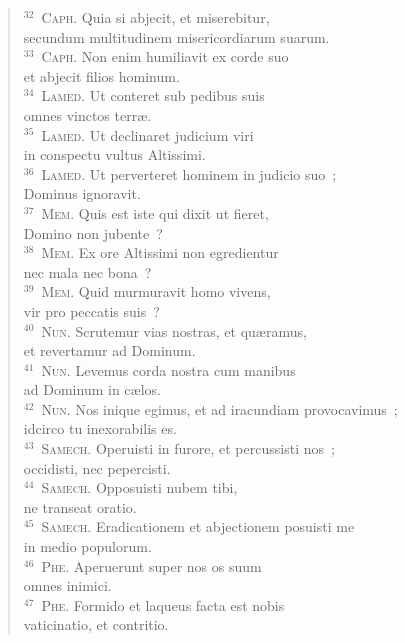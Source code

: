 \begin{flushleft}
\begin{verse}
${}^{32}$~\textsc{Caph.} Quia si abjecit, et miserebitur,\\ secundum multitudinem misericordiarum suarum.\\
${}^{33}$~\textsc{Caph.} Non enim humiliavit ex corde suo\\ et abjecit filios hominum.\\
${}^{34}$~\textsc{Lamed.} Ut conteret sub pedibus suis\\ omnes vinctos terr\ae .\\
${}^{35}$~\textsc{Lamed.} Ut declinaret judicium viri\\ in conspectu vultus Altissimi.\\
${}^{36}$~\textsc{Lamed.} Ut perverteret hominem in judicio suo~;\\ Dominus ignoravit.\\
${}^{37}$~\textsc{Mem.} Quis est iste qui dixit ut fieret,\\ Domino non jubente~?\\
${}^{38}$~\textsc{Mem.} Ex ore Altissimi non egredientur\\ nec mala nec bona~?\\
${}^{39}$~\textsc{Mem.} Quid murmuravit homo vivens,\\ vir pro peccatis suis~?\\
${}^{40}$~\textsc{Nun.} Scrutemur vias nostras, et qu\ae ramus,\\ et revertamur ad Dominum.\\
${}^{41}$~\textsc{Nun.} Levemus corda nostra cum manibus\\ ad Dominum in c\ae los.\\
${}^{42}$~\textsc{Nun.} Nos inique egimus, et ad iracundiam provocavimus~;\\ idcirco tu inexorabilis es.\\
${}^{43}$~\textsc{Samech.} Operuisti in furore, et percussisti nos~;\\ occidisti, nec pepercisti.\\
${}^{44}$~\textsc{Samech.} Opposuisti nubem tibi,\\ ne transeat oratio.\\
${}^{45}$~\textsc{Samech.} Eradicationem et abjectionem posuisti me\\ in medio populorum.\\
${}^{46}$~\textsc{Phe.} Aperuerunt super nos os suum\\ omnes inimici.\\
${}^{47}$~\textsc{Phe.} Formido et laqueus facta est nobis\\ vaticinatio, et contritio.\\

\end{verse}
\end{flushleft}
